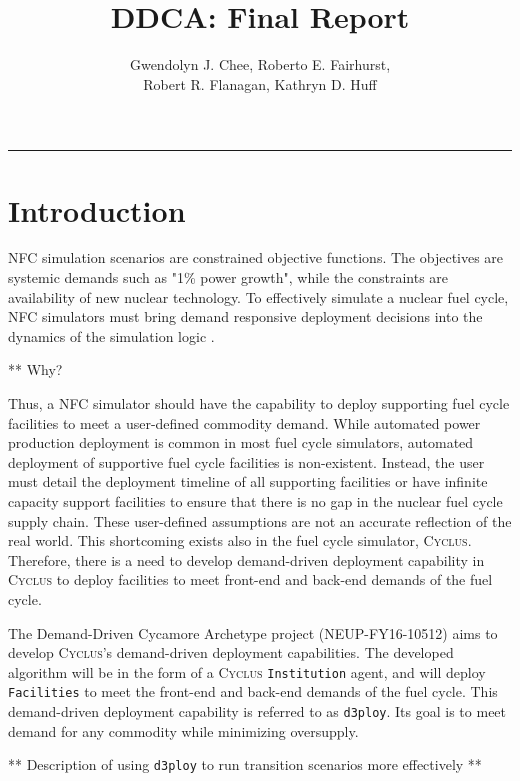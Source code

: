 \documentclass[11pt,letterpaper]{article}
\title{DDCA: Final Report}
\author{Gwendolyn J. Chee, Roberto E. Fairhurst, 
\\ \vspace{0.5em} Robert R. Flanagan, Kathryn D. Huff}
\newcommand{\Cyclus}{\textsc{Cyclus}\xspace}%
\newcommand{\deploy}{\texttt{d3ploy}\xspace}%
\begin{document}
	\maketitle
	\hrule

\section{Introduction}
\gls{NFC} simulation scenarios are constrained objective functions. 
The objectives are systemic demands such as "1\% power growth", 
while the constraints are availability of new nuclear technology.
To effectively simulate a nuclear fuel cycle, \gls{NFC} simulators 
must bring demand responsive deployment decisions into the dynamics
of the simulation logic \cite{huff_current_2017}. 

** Why? 

Thus, a \gls{NFC} simulator should have the capability to deploy 
supporting fuel cycle facilities to meet a user-defined commodity
demand. 
While automated power production deployment is common in most fuel
cycle simulators, automated deployment of supportive fuel cycle 
facilities is non-existent. 
Instead, the user must detail the deployment timeline of all 
supporting facilities or have infinite capacity support facilities
to ensure that there is no gap in the nuclear fuel cycle supply 
chain. 
These user-defined assumptions are not an accurate reflection 
of the real world. 
This shortcoming exists also in the fuel cycle simulator, \Cyclus. 
Therefore, there is a need to develop demand-driven deployment 
capability in \Cyclus to deploy facilities to meet front-end and 
back-end demands of the fuel cycle.

The Demand-Driven Cycamore Archetype project (NEUP-FY16-10512) 
aims to develop \Cyclus's demand-driven deployment capabilities. 
The developed algorithm will be in the form of a \Cyclus 
\texttt{Institution} agent, and will deploy \texttt{Facilities} 
to meet the front-end and back-end demands of the fuel cycle.
This demand-driven deployment capability is referred to as 
\deploy. 
Its goal is to meet demand for any commodity while minimizing 
oversupply. 

** Description of using \deploy to run transition scenarios more effectively ** 



\end{document}
